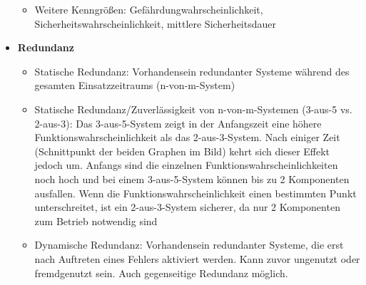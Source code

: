 \begin{itemize}
\begin{itemize}
		\item Weitere Kenngrößen: Gefährdungwahrscheinlichkeit, Sicherheitswahrscheinlichkeit, mittlere Sicherheitsdauer
	\end{itemize}
			\item \textbf{Redundanz}
	\begin{itemize}
		\item Statische Redundanz: Vorhandensein redundanter Systeme während des gesamten Einsatzzeitraums (n-von-m-System)
		\item Statische Redundanz/Zuverlässigkeit von n-von-m-Systemen (3-aus-5 vs. 2-aus-3): Das 3-aus-5-System zeigt in der Anfangszeit eine höhere Funktionswahrscheinlichkeit als das 2-aus-3-System. Nach einiger Zeit (Schnittpunkt der beiden Graphen im Bild) kehrt sich dieser Effekt jedoch um. Anfangs sind die einzelnen Funktionswahrscheinlichkeiten noch hoch und bei einem 3-aus-5-System können bis zu 2 Komponenten ausfallen. Wenn die Funktionswahrscheinlichkeit einen bestimmten Punkt unterschreitet, ist ein 2-aus-3-System sicherer, da nur 2 Komponenten zum Betrieb notwendig sind
		\item Dynamische Redundanz: Vorhandensein redundanter Systeme, die erst nach Auftreten eines Fehlers aktiviert werden. Kann zuvor ungenutzt oder fremdgenutzt sein. Auch gegenseitige Redundanz möglich.
	\end{itemize}
\end{itemize}


